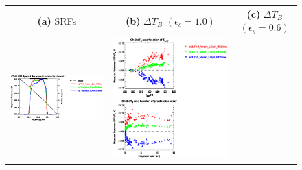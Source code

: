 \begin{figure}[H]
  \centering
  \begin{tabular}{c c c}
    \textsf{\textbf{(a)} SRFs} &
    \textsf{\textbf{(b)} $\Delta T_B$ $(\epsilon_s = 1.0)$} &
    \textsf{\textbf{(c)} $\Delta T_B$ $(\epsilon_s = 0.6)$} \\
    \includegraphics[bb=80 400 280 558,clip,scale=0.85]{graphics/srf/Tset/atms_npp.ch3.osrf.eps} &
    \includegraphics[bb=85 400 260 558,clip,scale=0.85]{graphics/dtb/Tset/e1.0_r0.0/atms_npp.ch3.dTb.eps} & 

\end{tabular}
\end{figure}
